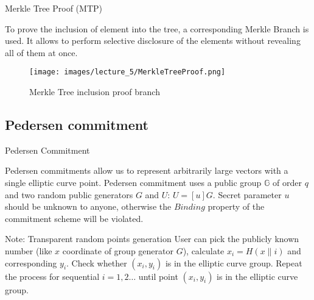 \documentclass[xcolor={usenames,dvipsnames}]{beamer}
\begin{document}
    \begin{frame}{Merkle Tree Proof (MTP)}

        To prove the inclusion of element into the tree, a corresponding Merkle Branch is used. It allows to perform selective
        disclosure of the elements without revealing all of them at once.

        \begin{figure}
            \centering
            \texttt{[image: images/lecture\_5/MerkleTreeProof.png]}
            \caption{Merkle Tree inclusion proof branch}
        \end{figure}

    \end{frame}

    \subsection{Pedersen commitment}

    \begin{frame}{Pedersen Commitment}

        Pedersen commitments allow us to represent arbitrarily large vectors with a single elliptic curve point. 
        Pedersen commitment uses a public group $\mathbb{G}$ of order $q$ and two random public generators
        $G$ and $U$: $U = [u]G$. Secret parameter $u$ should be unknown to anyone, otherwise the $\textit{Binding}$ 
        property of the commitment scheme will be violated.
    
        \begin{alertblock}{Note: Transparent random points generation}
            User can pick the publicly known number (like $x$ coordinate of group generator $G$), calculate $x_i = H(x \parallel i)$
            and corresponding $y_i$. Check whether $(x_i, y_i)$ is in the elliptic curve group. Repeat the process for sequential $i = 1, 2 \ldots$
            until point $(x_i, y_i)$ is in the elliptic curve group.
        \end{alertblock}    

    \end{frame}
\end{document}

